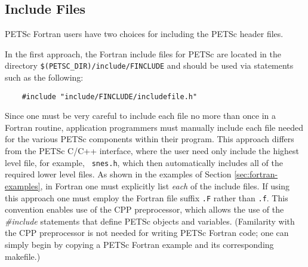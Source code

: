 \subsection{Include Files}
\label{sec:fortran_includes}

PETSc Fortran users have two choices for including the PETSc header 
files. 

\medskip

In the first  approach, 
the Fortran include files for PETSc are located in the directory 
{\tt \$(PETSC\_DIR)/include/FINCLUDE} and should be used via statements 
such as the following:
\begin{verbatim}
    #include "include/FINCLUDE/includefile.h"
\end{verbatim}
Since one must be very careful to include each file no more than once
in a Fortran routine, application programmers must manually include
each file needed for the various PETSc components within their
program.  This approach differs from the PETSc C/C++ interface, where
the user need only include the highest level file, for example, {\tt
snes.h}, which then automatically includes all of the required lower
level files.  As shown in the examples of Section
\ref{sec:fortran-examples}, in Fortran one must explicitly list {\em
each} of the include files. If using this approach one must employ
the Fortran file suffix {\tt .F}
rather than {\tt .f}.  This convention enables use of the CPP
preprocessor, which allows the use of the {\em \#include} statements
that define PETSc objects and variables. (Familarity with the CPP
preprocessor is not needed for writing PETSc Fortran code; one can simply
begin by copying a PETSc Fortran example and its corresponding
makefile.)  

\medskip

